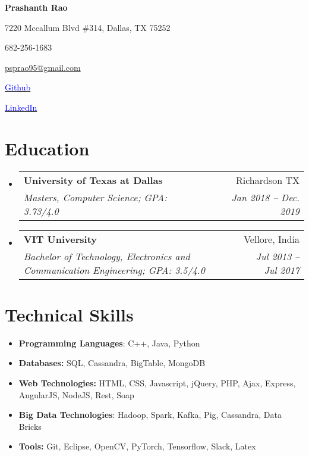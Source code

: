 \documentclass[letterpaper,11pt]{article}
\makeatletter
\newcommand{\resumeSubheading}[4]{
  \vspace{-1pt}\item
    \begin{tabular*}{0.97\textwidth}{l@{\extracolsep{\fill}}r}
      \textbf{#1} & #2 \\
      \textit{\small#3} & \textit{\small #4} \\
    \end{tabular*}\vspace{-5pt}
}
\newcommand{\resumeSubHeadingListStart}{\begin{itemize}[leftmargin=*]}
\newcommand{\resumeSubHeadingListEnd}{\end{itemize}}
\makeatother
\begin{document}
\begin{center}
  \textbf{\Huge Prashanth Rao}\\
  \vspace{0.05in}


    
    
    \begin{itemize*}
    \item7220 Mccallum Blvd \#314, Dallas, TX 75252
    \hspace{4in}
     \item  682-256-1683
     \hspace{1in}
     \item \href{mailto:psprao95@gmail.com}{psprao95@gmail.com}
    \end{itemize*}


  
  \begin{itemize*}
    \item   \href{https://www.github.com/psprao95}{\textcolor{blue}{Github}}
     \item   \href{https://www.linkedin.com/in/psprao}{\textcolor{blue}{LinkedIn}}
    \hspace{8in}
  
  
  \end{itemize*}
\end{center}

\section{Education}
  \resumeSubHeadingListStart
    \resumeSubheading
      {University of Texas at Dallas}{Richardson TX}
      {Masters, Computer Science;  GPA: 3.73/4.0}{Jan 2018 -- Dec. 2019}
    \resumeSubheading
      {VIT University}{Vellore, India}
      {Bachelor of Technology, Electronics and Communication Engineering;  GPA: 3.5/4.0}{Jul 2013 -- Jul 2017}
  \resumeSubHeadingListEnd



\section{Technical Skills}

\begin{itemize}[noitemsep,nolistsep,leftmargin=*]


\item \textbf{Programming Languages}: C++, Java, Python
\item \textbf{Databases:} SQL, Cassandra, BigTable, MongoDB
\item \textbf{Web Technologies:} HTML, CSS, Javascript, jQuery, PHP, Ajax, Express, AngularJS, NodeJS, Rest, Soap
 \item \textbf{Big Data Technologies}: Hadoop, Spark, Kafka, Pig, Cassandra, Data Bricks
\item \textbf{Tools:} Git, Eclipse, OpenCV,  PyTorch, Tensorflow, Slack, Latex
  \end{itemize}
 
\end{document}
